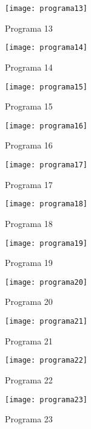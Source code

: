\documentclass[a4paper,11pt,fleqn]{article}
\begin{document}
\newpage
{}

\begin{figure}[!ht]
    \caption{Programa 13}
    \centering
    \texttt{[image: programa13]}
\end{figure}

\begin{figure}[!ht]
    \caption{Programa 14}
    \centering
    \texttt{[image: programa14]}
\end{figure} 

\begin{figure}[!ht]
    \caption{Programa 15}
    \centering
    \texttt{[image: programa15]}
\end{figure}

\begin{figure}[!ht]
    \caption{Programa 16}
    \centering
    \texttt{[image: programa16]}
\end{figure} 

\begin{figure}[!ht]
    \caption{Programa 17}
    \centering
    \texttt{[image: programa17]}
\end{figure}

\begin{figure}[!ht]
    \caption{Programa 18}
    \centering
    \texttt{[image: programa18]}
\end{figure}

\begin{figure}[!ht]
    \caption{Programa 19}
    \centering
    \texttt{[image: programa19]}
\end{figure}

\begin{figure}[!ht]
    \caption{Programa 20}
    \centering
    \texttt{[image: programa20]}
\end{figure}    

\begin{figure}[!ht]
    \caption{Programa 21}
    \centering
    \texttt{[image: programa21]}
\end{figure}

\begin{figure}[!ht]
    \caption{Programa 22}
    \centering
    \texttt{[image: programa22]}
\end{figure} 
 
\begin{figure}[!ht]
    \caption{Programa 23}
    \centering
    \texttt{[image: programa23]}
\end{figure} 
\end{document}
